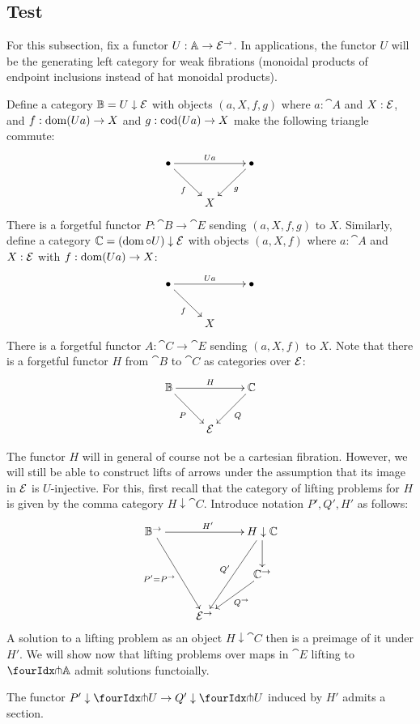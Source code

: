 \documentclass[reqno,10pt,a4paper,oneside]{amsart}
\begin{document}
\subsection{Test}

For this subsection, fix a functor $U : \mathbb{A} \to \mathcal{E}^{\to}$.
In applications, the functor $U$ will be the generating left category for weak fibrations (monoidal products of endpoint inclusions instead of hat monoidal products).

Define a category $\mathbb{B} = U \downarrow \mathcal{E}$ with objects $(a, X, f, g)$ where $a : \cat{A}$ and $X : \mathcal{E}$, and $f : \operatorname{dom}(U a) \to X$ and $g : \operatorname{cod}(U a) \to X$ make the following triangle commute:
\[
\xymatrix{
  \bullet
  \ar[rr]^{U a}
  \ar[dr]_{f}
&&
  \bullet
  \ar[dl]^{g}
\\&
  X
}
\]
There is a forgetful functor $P : \cat{B} \to \cat{E}$ sending $(a, X, f, g)$ to $X$.
Similarly, define a category $\mathbb{C} = (\operatorname{dom} \mathbin{\circ} U) \downarrow \mathcal{E}$ with objects $(a, X, f)$ where $a : \cat{A}$ and $X : \mathcal{E}$ with $f : \operatorname{dom}(U a) \to X$:
\[
\xymatrix{
  \bullet
  \ar[rr]^{U a}
  \ar[dr]_{f}
&&
  \bullet
\\&
  X
}
\]
There is a forgetful functor $A : \cat{C} \to \cat{E}$ sending $(a, X, f)$ to $X$.
Note that there is a forgetful functor $H$ from $\cat{B}$ to $\cat{C}$ as categories over $\mathcal{E}$:
\[
\xymatrix{
  \cat{B}
  \ar[rr]^{H}
  \ar[dr]_{P}
&&
  \cat{C}
  \ar[dl]^{Q}
\\&
  \catE
}
\]

The functor $H$ will in general of course not be a cartesian fibration.
However, we will still be able to construct lifts of arrows under the assumption that its image in $\mathcal{E}$ is $U$-injective.
For this, first recall that the category of lifting problems for $H$ is given by the comma category $H \downarrow \cat{C}$.
Introduce notation $P', Q', H'$ as follows:
\[
\xymatrix{
  \cat{B}^{\to}
  \ar[rr]^{H'}
  \ar[ddr]_{P' = P^{\to}}
&&
  H \downarrow \cat{C}
  \ar[d]
  \ar[ddl]_{Q'}
\\&&
  \catC^{\to}
  \ar[dl]^{Q^{\to}}
\\&
  \catE^{\to}
}
\]
A solution to a lifting problem as an object $H \downarrow \cat{C}$ then is a preimage of it under $H'$.
We will show now that lifting problems over maps in $\cat{E}$ lifting to $\liftr{\cat{A}}$ admit solutions functoially.

\begin{lemma}
The functor $P' \downarrow \liftr{U} \to Q' \downarrow \liftr{U}$ induced by $H'$ admits a section.
\end{lemma}
\end{document}
